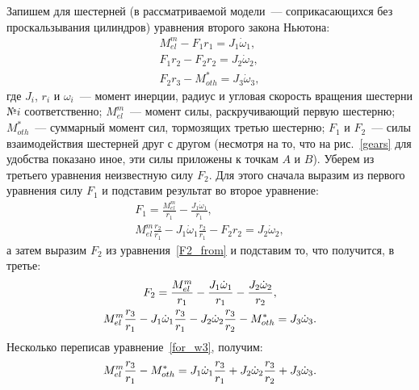 \documentclass[12pt, a4paper, openany]{extarticle}
\begin{document}
Запишем для шестерней (в рассматриваемой модели~--- соприкасающихся без проскальзывания цилиндров) уравнения второго закона Ньютона:
\begin{gather}
	M_{el}^{m} - F_1r_1 = J_1\dot\omega_1,\\
	F_1r_2 - F_2r_2 = J_2\dot\omega_2,\\
	F_2r_3 - M_{oth}^* = J_3\dot\omega_3,
\end{gather}
где $J_i$, $r_i$ и $\omega_i$~--- момент инерции, радиус и угловая скорость вращения шестерни №$i$ соответственно; $M_{el}^{m}$~--- момент силы, раскручивающий первую шестерню; $M_{oth}^*$~--- суммарный момент сил, тормозящих третью шестерню; $F_1$ и $F_2$~--- силы взаимодействия шестерней друг с другом (несмотря на то, что на рис.~\ref{gears} для удобства показано иное, эти силы приложены к точкам $A$ и $B$).
Уберем из третьего уравнения неизвестную силу $F_2$.
Для этого сначала выразим из первого уравнения силу $F_1$ и подставим результат во второе уравнение:
\begin{gather}
	F_1 = \frac{M^m_{el}}{r_1} - \frac{J_1\dot\omega_1}{r_1},\\
	M^m_{el}\frac{r_2}{r_1} - J_1\dot\omega_1\frac{r_2}{r_1} - F_2r_2 = J_2\dot\omega_2, \label{F2_from}
\end{gather}
а затем выразим $F_2$ из уравнения~\eqref{F2_from} и подставим то, что получится, в третье:
\begin{gather}
	F_2 = \frac{M^m_{el}}{r_1} - \frac{J_1\dot\omega_1}{r_1} -\frac{J_2\dot\omega_2}{r_2},\\
	M^m_{el}\frac{r_3}{r_1} - J_1\dot\omega_1\frac{r_3}{r_1} - J_2\dot\omega_2\frac{r_3}{r_2} - M_{oth}^* = J_3\dot\omega_3\ldotp 
	\label{for_w3}
\end{gather}
Несколько переписав уравнение~\eqref{for_w3}, получим:
\begin{equation}\label{pochti}
	M_{el}^m\frac{r_3}{r_1} - M_{oth}^* = J_1\dot\omega_1\frac{r_3}{r_1} + J_2\dot\omega_2\frac{r_3}{r_2} + J_3\dot\omega_3\ldotp
\end{equation} 
\end{document}

